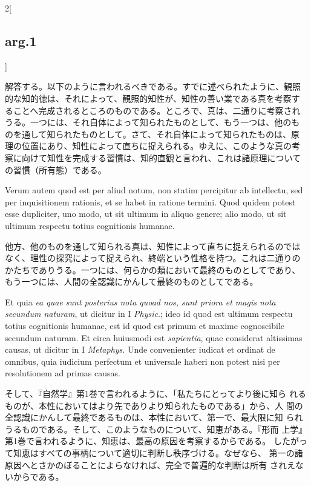 \documentclass[paper=a4paper,fontsize=10pt,jafontsize=9pt,titlepage]{jlreq}
\begin{document}
\begin{paracol}{2}[\subsection{arg.1}]
\switchcolumn

解答する。以下のように言われるべきである。すでに述べられたように、観照
的な知的徳は、それによって、観照的知性が、知性の善い業である真を考察す
ることへ完成されるところのものである。ところで、真は、二通りに考察され
うる。一つには、それ自体によって知られたものとして、もう一つは、他のも
のを通して知られたものとして。さて、それ自体によって知られたものは、原
理の位置にあり、知性によって直ちに捉えられる。ゆえに、このような真の考
察に向けて知性を完成する習慣は、知的直観と言われ、これは諸原理について
の習慣（所有態）である。

\switchcolumn*

Verum autem quod est per aliud notum, non statim percipitur ab
intellectu, sed per inquisitionem rationis, et se habet in ratione
termini. Quod quidem potest esse dupliciter, uno modo, ut sit ultimum
in aliquo genere; alio modo, ut sit ultimum respectu totius
cognitionis humanae.

\switchcolumn

他方、他のものを通して知られる真は、知性によって直ちに捉えられるのでは
なく、理性の探究によって捉えられ、終端という性格を持つ。これは二通りの
かたちでありうる。一つには、何らかの類において最終のものとしてであり、
もう一つには、人間の全認識にかんして最終のものとしてである。

\switchcolumn*

Et quia {\itshape ea quae sunt posterius nota quoad nos, sunt priora
et magis nota secundum naturam}, ut dicitur in I {\itshape Physic}.;
ideo id quod est ultimum respectu totius cognitionis humanae, est id
quod est primum et maxime cognoscibile secundum naturam. Et circa
huiusmodi est {\itshape sapientia}, quae considerat altissimas causas,
ut dicitur in I {\itshape Metaphys}. Unde convenienter iudicat et
ordinat de omnibus, quia iudicium perfectum et universale haberi non
potest nisi per resolutionem ad primas causas.

\switchcolumn

そして、『自然学』第1巻で言われるように、「私たちにとってより後に知ら
れるものが、本性においてはより先でありより知られたものである」から、人
間の全認識にかんして最終であるものは、本性において、第一で、最大限に知
られうるものである。そして、このようなものについて、知恵がある。『形而
上学』第1巻で言われるように、知恵は、最高の原因を考察するからである。
したがって知恵はすべての事柄について適切に判断し秩序づける。なぜなら、
第一の諸原因へとさかのぼることによらなければ、完全で普遍的な判断は所有
されえないからである。


\end{paracol}
\end{document}
